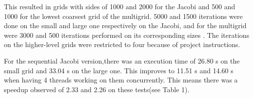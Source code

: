 \documentclass{article}
\begin{document}
\begin{table}
\centering
{}
\caption{Jacobi test results}
    \label{fig:jacobi}
\end{table}

This resulted in grids with sides of 1000 and 2000 for the Jacobi and 500 and 1000 for the lowest coarsest grid of the multigrid. 5000 and 1500 iterations were done on the small and large one respectively on the Jacobi, and for the multigrid were 3000 and 500 iterations performed on its corresponding sizes . The iterations on the higher-level grids were restricted to four because of project instructions.


For the sequential Jacobi version,there was an execution time of 26.80 s on the small grid and 33.04 s on the large one. This improves to 11.51 s and 14.60 s when having 4 threads working on them concurrently. This means there was a speedup observed of 2.33 and 2.26 on these tests(see Table 1).
\end{document}
